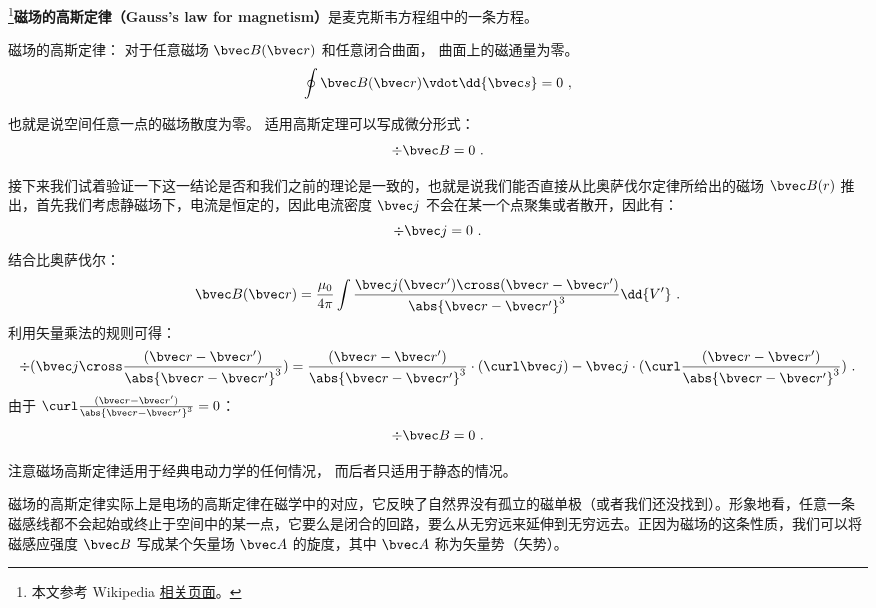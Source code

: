 
\begin{issues}
\issueDraft
\end{issues}


\footnote{本文参考 Wikipedia \href{https://en.wikipedia.org/wiki/Gauss's_law_for_magnetism}{相关页面}。}\textbf{磁场的高斯定律（Gauss's law for magnetism）}是麦克斯韦方程组中的一条方程。

磁场的高斯定律： 对于任意磁场 $\bvec B(\bvec r)$ 和任意闭合曲面， 曲面上的磁通量为零。
\begin{equation}
\oint \bvec B(\bvec r) \vdot \dd{\bvec s} = 0~,
\end{equation}

也就是说空间任意一点的磁场散度为零。 适用高斯定理可以写成微分形式：
\begin{equation}
\div\bvec B = 0~.
\end{equation}

接下来我们试着验证一下这一结论是否和我们之前的理论是一致的，也就是说我们能否直接从比奥萨伐尔定律所给出的磁场 $\bvec B(r)$ 推出，首先我们考虑静磁场下，电流是恒定的，因此电流密度 $\bvec j$ 不会在某一个点聚集或者散开，因此有：
\begin{equation}
\div \bvec j = 0  ~.
\end{equation}
结合比奥萨伐尔：
\begin{equation}
\bvec B(\bvec r) = \frac{\mu_0}{4\pi} \int \frac{\bvec j(\bvec r') \cross (\bvec r - \bvec r')}{\abs{\bvec r - \bvec r'}^3} \dd{V'}~.
\end{equation}
利用矢量乘法的规则可得：
\begin{equation}
\div(\bvec j \cross \frac{(\bvec r - \bvec r')}{\abs{\bvec r - \bvec r'}^3})=\frac{(\bvec r - \bvec r')}{\abs{\bvec r - \bvec r'}^3}\cdot(\curl \bvec j)-\bvec j\cdot(\curl \frac{(\bvec r - \bvec r')}{\abs{\bvec r - \bvec r'}^3})~.
\end{equation}
由于 $\curl \frac{(\bvec r - \bvec r')}{\abs{\bvec r - \bvec r'}^3} = 0$：
\begin{equation}
\div \bvec B = 0  ~.
\end{equation}

注意磁场高斯定律适用于经典电动力学的任何情况， 而后者只适用于静态的情况。

磁场的高斯定律实际上是电场的高斯定律在磁学中的对应，它反映了自然界没有孤立的磁单极（或者我们还没找到）。形象地看，任意一条磁感线都不会起始或终止于空间中的某一点，它要么是闭合的回路，要么从无穷远来延伸到无穷远去。正因为磁场的这条性质，我们可以将磁感应强度 $\bvec B$ 写成某个矢量场 $\bvec A$ 的旋度，其中 $\bvec A$ 称为矢量势（矢势）。
